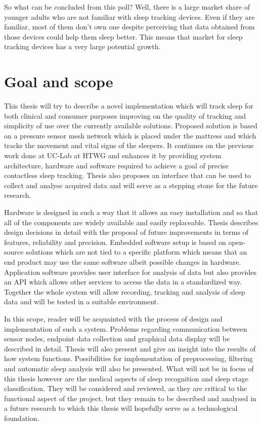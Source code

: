 So what can be concluded from this poll? Well, there is a large market share of younger adults who are not familiar with sleep tracking devices. Even if they are familiar, most of them don't own one despite perceiving that data obtained from those devices could help them sleep better. This means that market for sleep tracking devices has a very large potential growth.


\section{Goal and scope}

This thesis will try to describe a novel implementation which will track sleep for both clinical and consumer purposes improving on the quality of tracking and simplicity of use over the currently available solutions. Proposed solution is based on a pressure sensor mesh network which is placed under the mattress and which tracks the movement and vital signs of the sleepers. It continues on the previous work done at \ac{UC-Lab} at \ac{HTWG} and enhances it by providing system architecture, hardware and software required to achieve a goal of precise contactless sleep tracking. Thesis also proposes an interface that can be used to collect and analyse acquired data and will serve as a stepping stone for the future research.

Hardware is designed in such a way that it allows an easy installation and so that all of the components are widely available and easily replaceable. Thesis describes design decisions in detail with the proposal of future improvements in terms of features, reliability and precision. Embedded software setup is based on open-source solutions which are not tied to a specific platform which means that an end product may use the same software albeit possible changes in hardware. Application software provides user interface for analysis of data but also provides an \ac{API} which allows other services to access the data in a standardized way. Together the whole system will allow recording, tracking and analysis of sleep data and will be tested in a suitable environment.

In this scope, reader will be acquainted with the process of design and implementation of such a system. Problems regarding communication between sensor nodes, endpoint data collection and graphical data display will be described in detail. Thesis will also present and give an insight into the results of how system functions. Possibilities for implementation of preprocessing, filtering and automatic sleep analysis will also be presented. What will not be in focus of this thesis however are the medical aspects of sleep recognition and sleep stage classification. They will be considered and reviewed, as they are critical to the functional aspect of the project, but they remain to be described and analysed in a future research to which this thesis will hopefully serve as a technological foundation.


